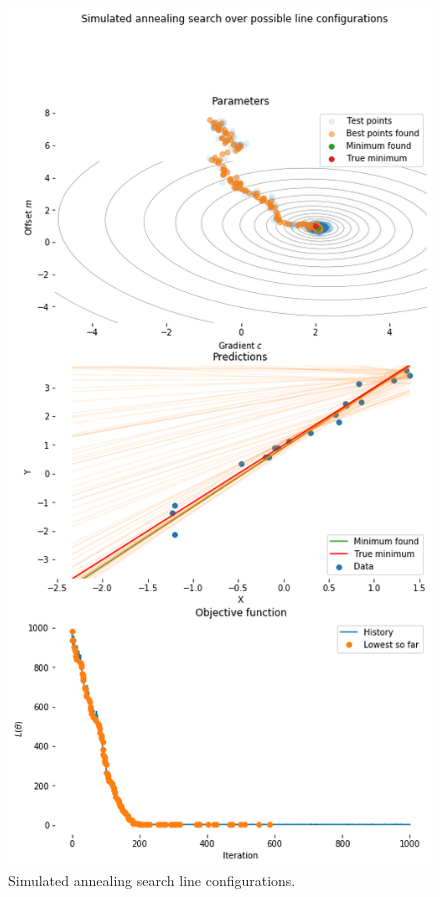 \documentclass[a4paper, openany]{memoir}
\begin{document}
\begin{figure}[H]
    \centering
    \includegraphics[scale=0.5]{src/4.19 simulated annealing search line configurations.png}
    \caption{Simulated annealing search line configurations.}
\end{figure}
\end{document}
